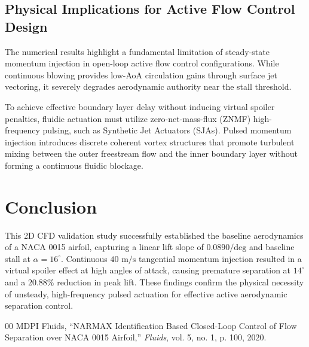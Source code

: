 \documentclass[conference]{IEEEtran}
\begin{document}
\subsection{Physical Implications for Active Flow Control Design}
The numerical results highlight a fundamental limitation of steady-state momentum injection in open-loop active flow control configurations. While continuous blowing provides low-AoA circulation gains through surface jet vectoring, it severely degrades aerodynamic authority near the stall threshold. 

To achieve effective boundary layer delay without inducing virtual spoiler penalties, fluidic actuation must utilize zero-net-mass-flux (ZNMF) high-frequency pulsing, such as Synthetic Jet Actuators (SJAs). Pulsed momentum injection introduces discrete coherent vortex structures that promote turbulent mixing between the outer freestream flow and the inner boundary layer without forming a continuous fluidic blockage.

\section{Conclusion}
This 2D CFD validation study successfully established the baseline aerodynamics of a NACA 0015 airfoil, capturing a linear lift slope of $0.0890/\text{deg}$ and baseline stall at $\alpha = 16^\circ$. Continuous $40\text{ m/s}$ tangential momentum injection resulted in a virtual spoiler effect at high angles of attack, causing premature separation at $14^\circ$ and a $20.88\%$ reduction in peak lift. These findings confirm the physical necessity of unsteady, high-frequency pulsed actuation for effective active aerodynamic separation control.

\begin{thebibliography}{00}
 MDPI Fluids, ``NARMAX Identification Based Closed-Loop Control of Flow Separation over NACA 0015 Airfoil,'' \textit{Fluids}, vol. 5, no. 1, p. 100, 2020.
\end{thebibliography}
\end{document}
